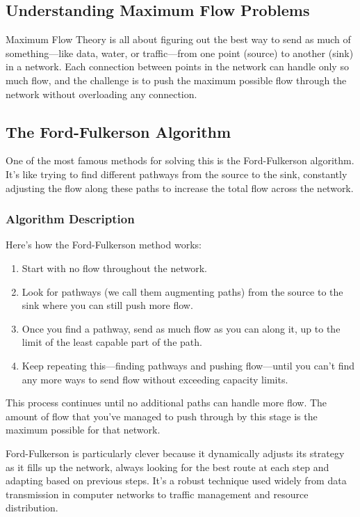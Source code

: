 \documentclass[12pt]{book} %
\begin{document}
\subsection{Understanding Maximum Flow Problems}
Maximum Flow Theory is all about figuring out the best way to send as much of something—like data, water, or traffic—from one point (source) to another (sink) in a network. Each connection between points in the network can handle only so much flow, and the challenge is to push the maximum possible flow through the network without overloading any connection.

\subsection{The Ford-Fulkerson Algorithm}
One of the most famous methods for solving this is the Ford-Fulkerson algorithm. It’s like trying to find different pathways from the source to the sink, constantly adjusting the flow along these paths to increase the total flow across the network.

\subsubsection{Algorithm Description}
Here’s how the Ford-Fulkerson method works:
\begin{enumerate}
    \item Start with no flow throughout the network.
    \item Look for pathways (we call them augmenting paths) from the source to the sink where you can still push more flow.
    \item Once you find a pathway, send as much flow as you can along it, up to the limit of the least capable part of the path.
    \item Keep repeating this—finding pathways and pushing flow—until you can’t find any more ways to send flow without exceeding capacity limits.
\end{enumerate}

This process continues until no additional paths can handle more flow. The amount of flow that you've managed to push through by this stage is the maximum possible for that network.

Ford-Fulkerson is particularly clever because it dynamically adjusts its strategy as it fills up the network, always looking for the best route at each step and adapting based on previous steps. It’s a robust technique used widely from data transmission in computer networks to traffic management and resource distribution.
\end{document}
